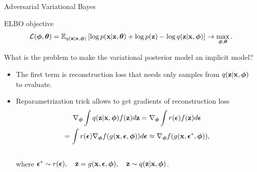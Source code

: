 \begin{frame}{Adversarial Variational Bayes}
	\begin{block}{ELBO objective}
		\vspace{-0.5cm}
		\[
			 \mathcal{L} (\boldsymbol{\phi}, \boldsymbol{\theta})  = \mathbb{E}_{q(\mathbf{z} | \mathbf{x}, \boldsymbol{\phi})} \left[\log p(\mathbf{x} | \mathbf{z}, \boldsymbol{\theta}) + \log p(\mathbf{z}) - \log q(\mathbf{z}| \mathbf{x}, \boldsymbol{\phi}) \right] \rightarrow \max_{\boldsymbol{\phi}, \boldsymbol{\theta}}.
		\]	
		\vspace{-0.5cm}
	\end{block}
	What is the problem to make the variational posterior model an implicit model?
	\begin{itemize}
	\item The first term is reconstruction loss that needs only samples from $q(\mathbf{z} | \mathbf{x}, \boldsymbol{\phi})$ to evaluate.
	\item Reparametrization trick allows to get gradients of reconstruction loss
		\vspace{-0.4cm}
		\begin{multline*}
			\nabla_{\boldsymbol{\phi}}\int q(\mathbf{z}|\mathbf{x}, \boldsymbol{\phi}) f(\mathbf{z}) d\mathbf{z} = \nabla_{\boldsymbol{\phi}}\int r(\boldsymbol{\epsilon})  f(\mathbf{z}) d\boldsymbol{\epsilon} \\ = \int r(\boldsymbol{\epsilon}) \nabla_{\boldsymbol{\phi}} f(g(\mathbf{x}, \boldsymbol{\epsilon}, \boldsymbol{\phi})) d\boldsymbol{\epsilon} \approx \nabla_{\boldsymbol{\phi}} f(g(\mathbf{x}, \boldsymbol{\epsilon}^*, \boldsymbol{\phi})),
		\end{multline*}
		\vspace{-0.6cm} \\
		where $\boldsymbol{\epsilon}^* \sim r(\boldsymbol{\epsilon}), \quad \mathbf{z} = g(\mathbf{x}, \boldsymbol{\epsilon}, \boldsymbol{\phi}), \quad \mathbf{z} \sim q(\mathbf{z} | \mathbf{x}, \boldsymbol{\phi})$.
	\end{itemize}
\end{frame}
